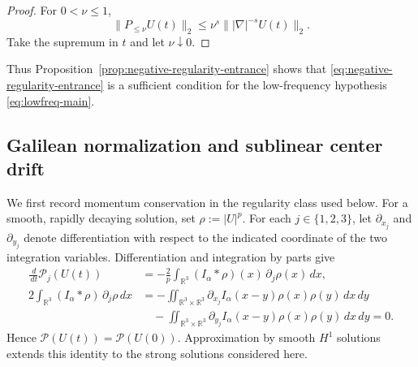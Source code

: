 \documentclass[preprint,12pt]{elsarticle}
\numberwithin{equation}{section}
\theoremstyle{remark}
\newcommand{\R}{\mathbb R}
\newcommand{\dd}{\,d}
\newcommand{\Pcal}{\mathcal P}
\begin{document}
\begin{proof}
For $0<\nu\le1$,
\[
  \|P_{\le\nu}U(t)\|_2
  \le\nu^s\||\nabla|^{-s}U(t)\|_2.
\]
Take the supremum in $t$ and let $\nu\downarrow0$.
\end{proof}
Thus Proposition~\ref{prop:negative-regularity-entrance} shows that \eqref{eq:negative-regularity-entrance} is a sufficient condition for the low-frequency hypothesis \eqref{eq:lowfreq-main}.

\subsection{Galilean normalization and sublinear center drift}

We first record momentum conservation in the regularity class used below. For a smooth, rapidly decaying solution, set $\rho:=|U|^p$. For each $j\in\{1,2,3\}$, let $\partial_{x_j}$ and $\partial_{y_j}$ denote differentiation with respect to the indicated coordinate of the two integration variables. Differentiation and integration by parts give
\begin{align*}
  \frac{\dd}{\dd t}\Pcal_j(U(t))
  &=-\frac{2}{p}\int_{\R^3}(I_\alpha*\rho)(x)\,\partial_j\rho(x)\dd x,
  \\
  2\int_{\R^3}(I_\alpha*\rho)\,\partial_j\rho\dd x
  &=-\iint_{\R^3\times\R^3}
  \partial_{x_j}I_\alpha(x-y)\rho(x)\rho(y)\dd x\dd y\\
  &\quad-\iint_{\R^3\times\R^3}
  \partial_{y_j}I_\alpha(x-y)\rho(x)\rho(y)\dd x\dd y
  =0.
\end{align*}
Hence $\Pcal(U(t))=\Pcal(U(0))$. Approximation by smooth $H^1$ solutions extends this identity to the strong solutions considered here.
\end{document}

